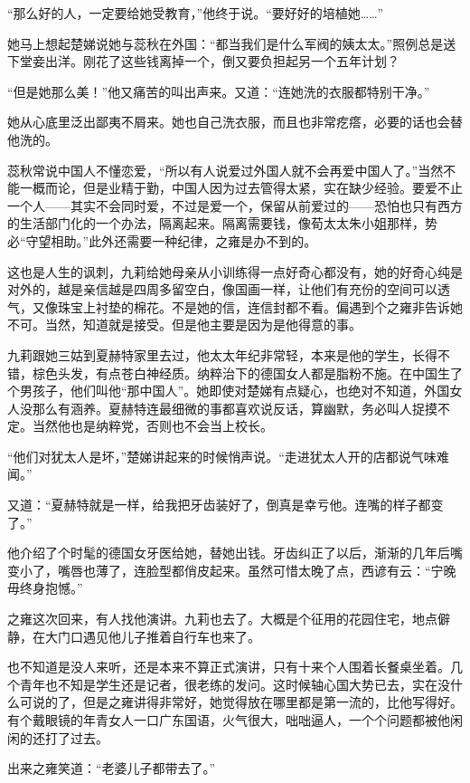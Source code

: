 \par “那么好的人，一定要给她受教育，”他终于说。“要好好的培植她……”
\par 她马上想起楚娣说她与蕊秋在外国：“都当我们是什么军阀的姨太太。”照例总是送下堂妾出洋。刚花了这些钱离掉一个，倒又要负担起另一个五年计划？
\par “但是她那么美！”他又痛苦的叫出声来。又道：“连她洗的衣服都特别干净。”
\par 她从心底里泛出鄙夷不屑来。她也自己洗衣服，而且也非常疙瘩，必要的话也会替他洗的。
\par 蕊秋常说中国人不懂恋爱，“所以有人说爱过外国人就不会再爱中国人了。”当然不能一概而论，但是业精于勤，中国人因为过去管得太紧，实在缺少经验。要爱不止一个人——其实不会同时爱，不过是爱一个，保留从前爱过的——恐怕也只有西方的生活部门化的一个办法，隔离起来。隔离需要钱，像荀太太朱小姐那样，势必“守望相助。”此外还需要一种纪律，之雍是办不到的。
\par 这也是人生的讽刺，九莉给她母亲从小训练得一点好奇心都没有，她的好奇心纯是对外的，越是亲信越是四周多留空白，像国画一样，让他们有充份的空间可以透气，又像珠宝上衬垫的棉花。不是她的信，连信封都不看。偏遇到个之雍非告诉她不可。当然，知道就是接受。但是他主要是因为是他得意的事。
\par 九莉跟她三姑到夏赫特家里去过，他太太年纪非常轻，本来是他的学生，长得不错，棕色头发，有点苍白神经质。纳粹治下的德国女人都是脂粉不施。在中国生了个男孩子，他们叫他“那中国人”。她即使对楚娣有点疑心，也绝对不知道，外国女人没那么有涵养。夏赫特连最细微的事都喜欢说反话，算幽默，务必叫人捉摸不定。当然他也是纳粹党，否则也不会当上校长。
\par “他们对犹太人是坏，”楚娣讲起来的时候悄声说。“走进犹太人开的店都说气味难闻。”
\par 又道：“夏赫特就是一样，给我把牙齿装好了，倒真是幸亏他。连嘴的样子都变了。”
\par 他介绍了个时髦的德国女牙医给她，替她出钱。牙齿纠正了以后，渐渐的几年后嘴变小了，嘴唇也薄了，连脸型都俏皮起来。虽然可惜太晚了点，西谚有云：“宁晚毋终身抱憾。”
\par 之雍这次回来，有人找他演讲。九莉也去了。大概是个征用的花园住宅，地点僻静，在大门口遇见他儿子推着自行车也来了。
\par 也不知道是没人来听，还是本来不算正式演讲，只有十来个人围着长餐桌坐着。几个青年也不知是学生还是记者，很老练的发问。这时候轴心国大势已去，实在没什么可说的了，但是之雍讲得非常好，她觉得放在哪里都是第一流的，比他写得好。有个戴眼镜的年青女人一口广东国语，火气很大，咄咄逼人，一个个问题都被他闲闲的还打了过去。
\par 出来之雍笑道：“老婆儿子都带去了。”
